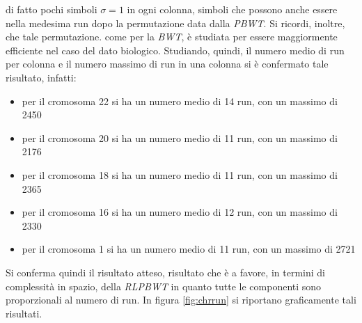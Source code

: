 di fatto pochi simboli $\sigma=1$ in ogni colonna, simboli che possono anche
essere nella medesima run dopo la permutazione data dalla
\textit{PBWT}. Si ricordi, inoltre, che tale permutazione. come per la
\textit{BWT}, è studiata per essere 
maggiormente efficiente nel caso del dato biologico. Studiando, quindi, il
numero medio di run per colonna e il numero 
massimo di run in una colonna si è confermato tale risultato, infatti:
\begin{itemize}
  \item per il cromosoma 22 si ha un numero medio di 14 run, con un massimo di
  2450
  \item per il cromosoma 20 si ha un numero medio di 11 run, con un massimo di
  2176
  \item per il cromosoma 18 si ha un numero medio di 11 run, con un massimo di
  2365
  \item per il cromosoma 16 si ha un numero medio di 12 run, con un massimo di
  2330
  \item per il cromosoma 1 si ha un numero medio di 11 run, con un massimo di
  2721 
\end{itemize}
Si conferma quindi il risultato atteso, risultato che è a favore, in termini di
complessità in spazio, della \textit{RLPBWT} in quanto tutte le componenti sono
proporzionali al numero di run. In figura \ref{fig:chrrun} si riportano
graficamente tali risultati.
